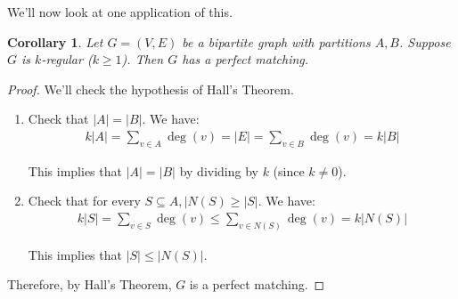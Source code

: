 \documentclass[]{article}
\newtheorem*{corollary}{Corollary}
\theoremstyle{definition}
\begin{document}
			We'll now look at one application of this.
			\begin{corollary}
				Let $G = (V, E)$ be a bipartite graph with partitions $A, B$. Suppose $G$ is $k$-regular ($k \ge 1$). Then $G$ has a perfect matching.
			\end{corollary}
			
			\begin{proof}
				We'll check the hypothesis of Hall's Theorem.
				\begin{enumerate}
					\item Check that $|A| = |B|$. We have:
						\begin{align*}
							k|A| = \sum_{v \in A} \deg(v) = |E| = \sum_{v \in B} \deg(v) = k|B|
						\end{align*}
						
						This implies that $|A| = |B|$ by dividing by $k$ (since $k \ne 0$).
					
					\item Check that for every $S \subseteq A, |N(S) \ge |S|$. We have:
						\begin{align*}
							k|S| = \sum_{v \in S} \deg(v) \le \sum_{v \in N(S)} \deg(v) = k|N(S)|
						\end{align*}
						
						This implies that $|S| \le |N(S)|$.
				\end{enumerate}
				
				Therefore, by Hall's Theorem, $G$ is a perfect matching.
			\end{proof}
			
	\newpage
\end{document}
